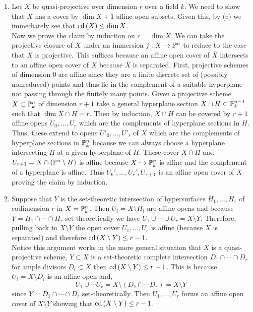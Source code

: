 \documentclass[12pt]{article}
\begin{document}
\begin{enumerate}
\item Let $X$ be quasi-projective over dimension $r$ over a field $k$. We need to show that $X$ has a cover by $\dim{X} + 1$ affine open subsets. Given this, by (c) we immediately see that $\cd{X} \le \dim{X}$. 
\bigskip\\
Now we prove the claim by induction on $r = \dim{X}$. We can take the projective closure of $X$ under an immersion $j : X \to \P^n$ to reduce to the case that $X$ is projective. This suffices because an affine open cover of $\overline{X}$ intersects to an affine open cover of $X$ because $\overline{X}$ is separated. First, projective schemes of dimension $0$ are affine since they are a finite discrete set of (possibly nonreduced) points and thus lie in the complement of a suitable hyperplane not passing through the finitely many points. Given a projective scheme $X \subset \P^n_k$ of dimension $r+1$ take a general hyperplane section $X \cap H \subset \P^{n-1}_k$ such that $\dim{X \cap H} = r$. Then by induction, $X \cap H$ can be covered by $r+1$ affine opens $U_0, \dots, U_{r}$ which are the complements of hyperplane sections in $H$. Thus, these extend to opens $U'_0, \dots, U'_r$ of $X$ which are the complements of hyperplane sections in $\P^n_k$ because we can always choose a hyperplane intersecting $H$ at a given hyperplane of $H$. These cover $X \cap H$ and $U_{r+1} = X \cap (\P^n \setminus H)$ is affine because $X \embed \P^n_k$ is affine and the complement of a hyperplane is affine. Thus $U_0', \dots, U_r', U_{r+1}$ is an affine open cover of $X$ proving the claim by induction.

\item Suppose that $Y$ is the set-theoretic intersection of hypersurfaces $H_1, \dots, H_r$ of codimension $r$ in $X = \P^n_k$. Then $U_i = X \setminus H_i$ are affine opens and because $Y = H_1 \cap \cdots \cap H_r$ set-theoretically we have $U_1 \cup \cdots \cup U_r = X \setminus Y$. Therefore, pulling back to $X \setminus Y$ the open cover $U_1, \dots, U_r$ is affine (because $X$ is separated) and therefore $\cd{X \setminus Y} \le r-1$.
\bigskip\\
Notice this argument works in the more general situation that $X$ is a quasi-projective scheme, $Y \subset X$ is a set-theoretic complete intersection $D_1 \cap \cdots \cap D_r$ for ample divisors $D_i \subset X$ then $\cd{X \setminus Y} \le r-1$. This is because $U_i = X \setminus D_i$ is an affine open and,
\[ U_1 \cup \cdots U_r = X \setminus (D_1 \cap \cdots D_r) = X \setminus Y \]
since $Y = D_1 \cap \cdots \cap D_r$ set-theoretically. Then $U_1, \dots, U_r$ forms an affine open cover of $X \setminus Y$ showing that $\cd{X \setminus Y} \le r-1$. 


\end{enumerate}
\end{document}
